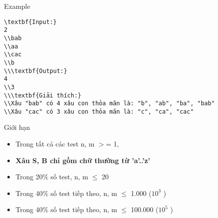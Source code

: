 Example
\begin{verbatim}
\textbf{Input:}
2
\\bab
\\aa
\\cac
\\b
\\\textbf{Output:}
4
\\3
\\\textbf{Giải thích:}
\\Xâu "bab" có 4 xâu con thỏa mãn là: "b", "ab", "ba", "bab"
\\Xâu "cac" có 3 xâu con thỏa mãn là: "c", "ca", "cac" \end{verbatim}
Giới hạn
\begin{itemize}
	\item     Trong tất cả các test n, m $>$= 1,   
	\item \textbf{     Xâu S, B chỉ gồm chữ thường từ 'a'..'z'    }
	\item     Trong 20\% số test, n, m  $\le$  20   
	\item     Trong 40\% số test tiếp theo, n, m  $\le$  1.000 ($10^{3}$    )   
	\item     Trong 40\% số test tiếp theo, n, m  $\le$  100.000 ($10^{5}$    )   
\end{itemize}